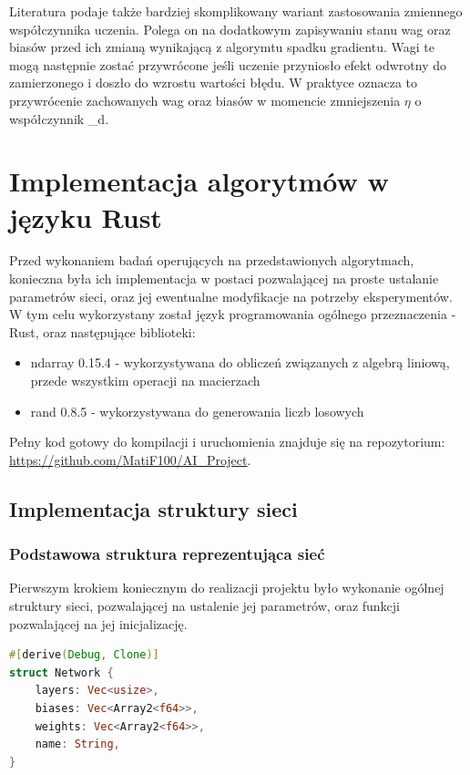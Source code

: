 \documentclass[12pt,twoside]{article}
\begin{document}
Literatura \cite{nnd} podaje także bardziej skomplikowany wariant zastosowania zmiennego współczynnika uczenia.
Polega on na dodatkowym zapisywaniu stanu wag oraz biasów przed ich zmianą wynikającą z algorymtu spadku gradientu.
Wagi te mogą następnie zostać przywrócone jeśli uczenie przyniosło efekt odwrotny do zamierzonego i doszło do wzrostu wartości błędu.
W praktyce oznacza to przywrócenie zachowanych wag oraz biasów w momencie zmniejszenia $\eta$ o współczynnik \xi_d.

\section{Implementacja algorytmów w języku Rust}
Przed wykonaniem badań operujących na przedstawionych algorytmach, konieczna była ich implementacja w postaci pozwalającej na proste ustalanie parametrów sieci, oraz jej ewentualne modyfikacje na potrzeby eksperymentów.
W tym celu wykorzystany został język programowania ogólnego przeznaczenia - Rust, oraz następujące biblioteki:
\begin{itemize}
	\item ndarray 0.15.4 - wykorzystywana do obliczeń związanych z algebrą liniową, przede wszystkim operacji na macierzach
	\item rand 0.8.5 - wykorzystywana do generowania liczb losowych
\end{itemize}
Pełny kod gotowy do kompilacji i uruchomienia znajduje się na repozytorium: \url{https://github.com/MatiF100/AI_Project}.

\subsection{Implementacja struktury sieci}
\subsubsection{Podstawowa struktura reprezentująca sieć}
Pierwszym krokiem koniecznym do realizacji projektu było wykonanie ogólnej struktury sieci, pozwalającej na ustalenie jej parametrów, oraz funkcji pozwalającej na jej inicjalizację.


\begin{lstlisting}[language=Rust,caption=Podstawowa struktura sieci neuronowej,label={lst:netStructure}]
#[derive(Debug, Clone)]
struct Network {
    layers: Vec<usize>,
    biases: Vec<Array2<f64>>,
    weights: Vec<Array2<f64>>,
    name: String,
}
\end{lstlisting}
\end{document}
